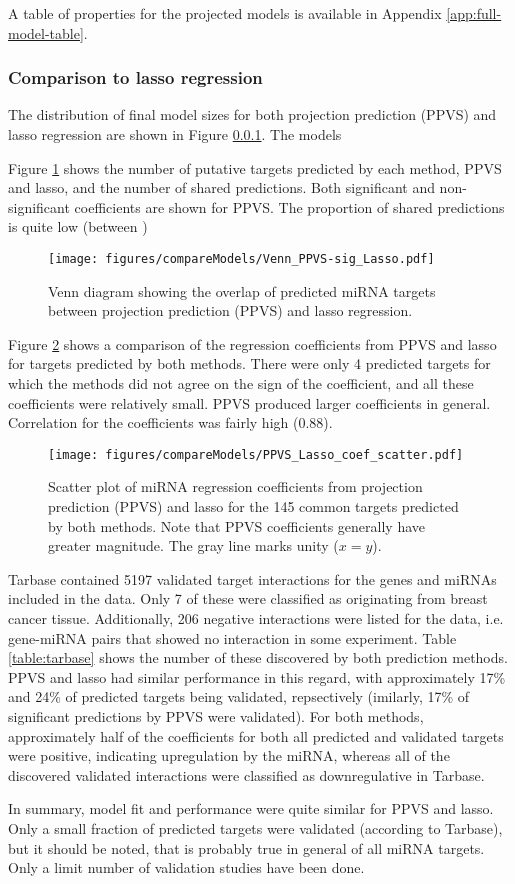 A table of properties for the projected models is available in Appendix
\ref{app:full-model-table}.


\subsubsection{Comparison to lasso regression}

The distribution of final model sizes for both projection prediction (PPVS)
and lasso regression are shown in Figure \ref{}. The models

Figure \ref{fig:venn-ppvs-lasso} shows the number of putative targets
predicted by each method, PPVS and lasso,
and the number of shared predictions. Both significant and non-significant
coefficients are shown for PPVS. The proportion of shared predictions is
quite low (between )

\begin{figure}[htb]
  \centering
  \texttt{[image: figures/compareModels/Venn\_PPVS-sig\_Lasso.pdf]}
  \caption{Venn diagram showing the overlap of predicted miRNA targets
  between projection prediction (PPVS) and lasso regression.}
  \label{fig:venn-ppvs-lasso}
\end{figure}

Figure \ref{fig:scatter-ppvs-lasso} shows a comparison of the regression
coefficients from PPVS and lasso for targets predicted by both methods. There
were only 4 predicted targets for which the methods did not agree on the sign
of the coefficient, and all these coefficients were relatively small. PPVS
produced larger coefficients in general. Correlation for the coefficients was
fairly high ($0.88$).

\begin{figure}[htb]
  \centering
  \texttt{[image: figures/compareModels/PPVS\_Lasso\_coef\_scatter.pdf]}
  \caption{Scatter plot of miRNA regression coefficients from projection
  prediction (PPVS) and lasso for the 145 common targets predicted by both methods.
  Note that PPVS coefficients generally have greater magnitude. The gray
  line marks unity ($x=y$).}
  \label{fig:scatter-ppvs-lasso}
\end{figure}

Tarbase contained 5197 validated target interactions for the genes and miRNAs
included in the data. Only 7 of these were classified as originating from
breast cancer tissue. Additionally, 206 negative interactions were listed for
the data, i.e. gene-miRNA pairs that showed no interaction in some experiment.
Table \ref{table:tarbase} shows the number of these discovered by both
prediction methods. PPVS and lasso had similar performance in this regard,
with approximately 17\% and 24\% of predicted targets being validated,
repsectively (imilarly, 17\% of significant predictions by PPVS were
validated). For both methods, approximately half of the coefficients for both
all predicted and validated targets were positive, indicating upregulation by
the miRNA, whereas all of the discovered validated interactions were classified as downregulative
in Tarbase.

In summary, model fit and performance were quite similar for PPVS and lasso.
Only a small fraction of predicted targets were validated (according to
Tarbase), but it should be noted, that is probably true in general
of all miRNA targets. Only a limit number of validation studies have
been done.
